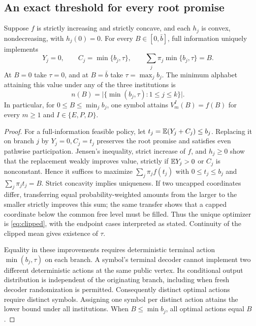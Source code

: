 \subsection{An exact threshold for every root promise}
\begin{theorem}\label{thm:clipped}
Suppose $f$ is strictly increasing and strictly concave, and each $h_j$ is convex, nondecreasing, with $h_j(0)=0$. For every $B\in[0,\bar b]$, full information uniquely implements
\begin{equation}\label{eq:clipped}
 Y_j=0,\qquad C_j=\min\{b_j,\tau\},\qquad
 \sum_j\pi_j\min\{b_j,\tau\}=B.
\end{equation}
At $B=0$ take $\tau=0$, and at $B=\bar b$ take $\tau=\max_jb_j$. The minimum alphabet attaining this value under any of the three institutions is
\[
 n(B)=\bigl|\{\min(b_j,\tau):1\leq j\leq k\}\bigr|.
\]
In particular, for $0\leq B\leq\min_jb_j$, one symbol attains $V_m^I(B)=f(B)$ for every $m\geq1$ and $I\in\{E,P,D\}$.
\end{theorem}
\begin{proof}
For a full-information feasible policy, let $t_j=\mathbb E(Y_j+C_j)\leq b_j$. Replacing it on branch $j$ by $Y_j=0,C_j=t_j$ preserves the root promise and satisfies even pathwise participation. Jensen's inequality, strict increase of $f$, and $h_j\geq0$ show that the replacement weakly improves value, strictly if $\mathbb E Y_j>0$ or $C_j$ is nonconstant. Hence it suffices to maximize $\sum_j\pi_j f(t_j)$ with $0\leq t_j\leq b_j$ and $\sum_j\pi_jt_j=B$. Strict concavity implies uniqueness. If two uncapped coordinates differ, transferring equal probability-weighted amounts from the larger to the smaller strictly improves this sum; the same transfer shows that a capped coordinate below the common free level must be filled. Thus the unique optimizer is \eqref{eq:clipped}, with the endpoint cases interpreted as stated. Continuity of the clipped mean gives existence of $\tau$.

Equality in these improvements requires deterministic terminal action $\min(b_j,\tau)$ on each branch. A symbol's terminal decoder cannot implement two different deterministic actions at the same public vertex. Its conditional output distribution is independent of the originating branch, including when fresh decoder randomization is permitted. Consequently distinct optimal actions require distinct symbols. Assigning one symbol per distinct action attains the lower bound under all institutions. When $B\leq\min b_j$, all optimal actions equal $B$.
\end{proof}

